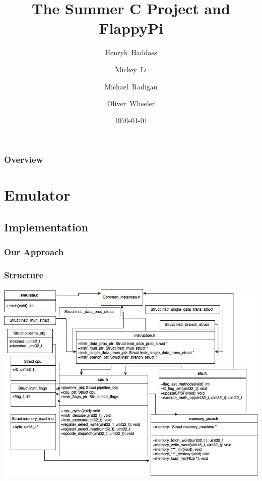 \documentclass{beamer}
\title[FlappyPi]{The Summer C Project and FlappyPi} %
\author[Group 16]{\small Henryk~Haddass \and Mickey~Li \and Michael~Radigan \and Oliver~Wheeler}%
\institute[Imperial DoC] %
{
Group 16
\medskip
}
\date{\today} %
\begin{document}
\begin{frame}
\titlepage %
\end{frame}

\begin{frame}
\frametitle{Overview} %
\tableofcontents %
\end{frame}


\section{Emulator} %


\subsection{Implementation} %

\begin{frame}
\frametitle{Our Approach}
\end{frame}
\begin{frame}
\frametitle{Structure}
\includegraphics[width=0.9\linewidth]{Images/Emulator_XML(2).jpg}
\end{frame}
\end{document}
